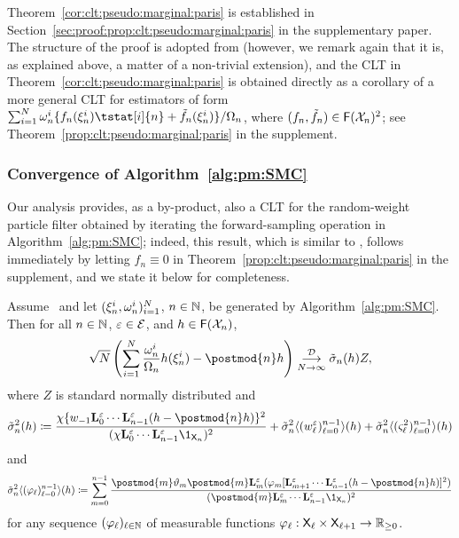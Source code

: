 Theorem~\ref{cor:clt:pseudo:marginal:paris} is established in Section~\ref{sec:proof:prop:clt:pseudo:marginal:paris} in the supplementary paper. The structure of the proof is adopted from \cite{olsson:westerborn:2017} (however, we remark again that it is, as explained above, a matter of a non-trivial extension), and the CLT in Theorem~\ref{cor:clt:pseudo:marginal:paris} is obtained directly as a corollary of a more general CLT for estimators of form $\sum_{i = 1}^\N \ewght{n}{i} \{ f_n(\epart{n}{i}) \tstat[i]{n} + \ftd{n}(\epart{n}{i}) \} / \sumwght{n}$, where $(f_n, \tilde{f}_{n}) \in \mathsf{F}(\mathcal{X}_n)^2$; see Theorem~\ref{prop:clt:pseudo:marginal:paris} in the supplement.  

\subsubsection{Convergence of Algorithm~\ref{alg:pm:SMC}} 
\label{sec:implied:convergence:results}

Our analysis provides, as a by-product, also a CLT for the random-weight particle filter obtained by iterating the forward-sampling operation in Algorithm~\ref{alg:pm:SMC}; indeed, this result, which is similar to \cite[Theorem~3]{fearnhead2008particle}, follows immediately by letting $f_n \equiv 0$ in Theorem~\ref{prop:clt:pseudo:marginal:paris} in the supplement, and we state it below for completeness. 

\begin{proposition} \label{prop:clt:pseudo:marginal:filter}
Assume~ and let $(\xi_{n}^{i}, \omega_{n}^{i})_{i = 1}^N$, $n \in \mathbb{N}$, be generated by Algorithm~\ref{alg:pm:SMC}. Then for all $n \in \mathbb{N}$, $\varepsilon \in \mathcal{E}$, and $h \in \mathsf{F}(\mathcal{X}_n)$, 
$$
 \sqrt{\N} \left( \sum_{i = 1}^\N \frac{\ewght{n}{i}}{\sumwght{n}} h(\epart{n}{i}) - \postmod{n} h \right) 
  \dlim \tilde{\sigma}_n(h) Z, 
$$
where $Z$ is standard normally distributed and
\begin{equation} \label{eq:as:var:pm:filter}
\tilde{\sigma}^2_n(h) \eqdef \frac{\chi\{ \initwgtfunc \ukmod{0} \cdots \ukmod{n - 1}(h - \postmod{n} h) \}^2}{(\chi \ukmod{0} \cdots \ukmod{n - 1} \1_{\Xset_n})^2} + \tilde{\sigma}^2_n \langle (\wgtfuncmod{\ell})_{\ell = 0}^{n - 1} \rangle (h) + \tilde{\sigma}^2_n \langle (\ukestvar{\ell})_{\ell = 0}^{n - 1} \rangle (h) 
\end{equation}
and
\begin{equation} \label{eq:non-recursive:filter:as:var}
\tilde{\sigma}^2_n \langle (\varphi_\ell)_{\ell = 0}^{n - 1} \rangle (h) 
\eqdef \sum_{m = 0}^{n - 1} \frac{\postmod{m} \adjfuncforward{m} \postmod{m} \ukmod{m}(\varphi_m [\ukmod{m + 1} \cdots \ukmod{n - 1} (h - \postmod{n} h)
]^2)}{(\postmod{m} \ukmod{m} \cdots \ukmod{n - 1} \1_{\Xset_n})^2} 
\end{equation}
for any sequence $(\varphi_\ell)_{\ell \in \mathbb{N}}$ of measurable functions $\varphi_\ell : \mathsf{X}_\ell \times \mathsf{X}_{\ell + 1} \to \mathbb{R}_{\geq 0}$. 
\end{proposition}

